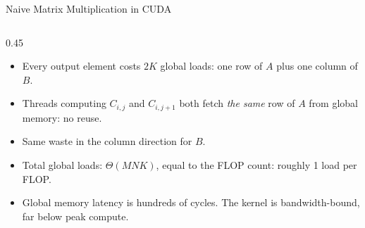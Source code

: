 \begin{frame}[fragile]{Naive Matrix Multiplication in CUDA}
\begin{columns}[T]
\begin{column}{0.45\textwidth}

    \vspace{0.4em}
    {\scriptsize
    \begin{itemize}\itemsep0.2em
      \item Every output element costs $2K$ global loads: one row of $A$ plus one column of $B$.
      \item Threads computing $C_{i,j}$ and $C_{i,j+1}$ both fetch \emph{the same} row of $A$ from global memory: no reuse.
      \item Same waste in the column direction for $B$.
      \item Total global loads: $\Theta(MNK)$, equal to the FLOP count: roughly 1 load per FLOP.
      \item Global memory latency is hundreds of cycles. The kernel is bandwidth-bound, far below peak compute.
    \end{itemize}
    }
  \end{column}
\end{columns}
\end{frame}

